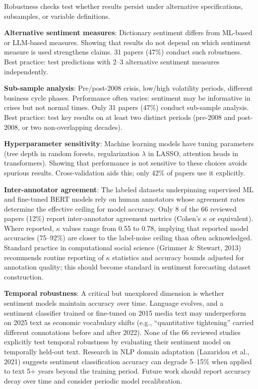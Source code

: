 \documentclass[11pt]{article}
\begin{document}
Robustness checks test whether results persist under alternative specifications, subsamples, or variable definitions.

\textbf{Alternative sentiment measures}: Dictionary sentiment differs from ML-based or LLM-based measures. Showing that results do not depend on which sentiment measure is used strengthens claims. 31 papers (47\%) conduct such robustness. Best practice: test predictions with 2--3 alternative sentiment measures independently.

\textbf{Sub-sample analysis}: Pre/post-2008 crisis, low/high volatility periods, different business cycle phases. Performance often varies: sentiment may be informative in crises but not normal times. Only 31 papers (47\%) conduct sub-sample analysis. Best practice: test key results on at least two distinct periods (pre-2008 and post-2008, or two non-overlapping decades).

\textbf{Hyperparameter sensitivity}: Machine learning models have tuning parameters (tree depth in random forests, regularization $\lambda$ in LASSO, attention heads in transformers). Showing that performance is not sensitive to these choices avoids spurious results. Cross-validation aids this; only 42\% of papers use it explicitly.

\textbf{Inter-annotator agreement}: The labeled datasets underpinning supervised ML and fine-tuned BERT models rely on human annotators whose agreement rates determine the effective ceiling for model accuracy. Only 8 of the 66 reviewed papers (12\%) report inter-annotator agreement metrics (Cohen's $\kappa$ or equivalent). Where reported, $\kappa$ values range from 0.55 to 0.78, implying that reported model accuracies (75--92\%) are closer to the label-noise ceiling than often acknowledged. Standard practice in computational social science (Grimmer \& Stewart, 2013) recommends routine reporting of $\kappa$ statistics and accuracy bounds adjusted for annotation quality; this should become standard in sentiment forecasting dataset construction.

\textbf{Temporal robustness}: A critical but unexplored dimension is whether sentiment models maintain accuracy over time. Language evolves, and a sentiment classifier trained or fine-tuned on 2015 media text may underperform on 2025 text as economic vocabulary shifts (e.g., ``quantitative tightening'' carried different connotations before and after 2022). None of the 66 reviewed studies explicitly test temporal robustness by evaluating their sentiment model on temporally held-out text. Research in NLP domain adaptation (Lazaridou et al., 2021) suggests sentiment classification accuracy can degrade 5--15\% when applied to text 5+ years beyond the training period. Future work should report accuracy decay over time and consider periodic model recalibration.
\end{document}
